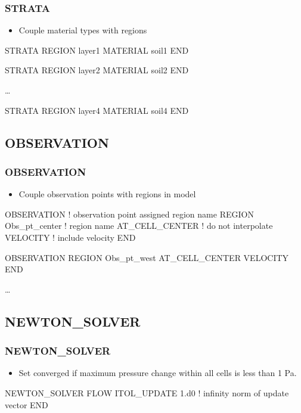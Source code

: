 \documentclass{beamer}
\newcommand\bluecomment[1]{{{\color{blue} #1}}}
\begin{document}
\begin{frame}[fragile]\frametitle{STRATA}

\begin{itemize}
\item Couple material types with regions
\end{itemize}

\begin{semiverbatim}
STRATA
  REGION layer1
  MATERIAL soil1
END

STRATA
  REGION layer2
  MATERIAL soil2
END

\ldots

STRATA
  REGION layer4
  MATERIAL soil4
END
\end{semiverbatim}

\end{frame}


\subsection{OBSERVATION}

\begin{frame}[fragile]\frametitle{OBSERVATION}

\begin{itemize}
\item Couple observation points with regions in model
\end{itemize}

\begin{semiverbatim}
OBSERVATION  \bluecomment{! observation point assigned region name}
  REGION Obs_pt_center  \bluecomment{! region name}
  AT_CELL_CENTER        \bluecomment{! do not interpolate}
  VELOCITY              \bluecomment{! include velocity}
END

OBSERVATION
  REGION Obs_pt_west
  AT_CELL_CENTER
  VELOCITY
END

\dots
\end{semiverbatim}

\end{frame}

\subsection{NEWTON\_SOLVER}

\begin{frame}[fragile]\frametitle{NEWTON\_SOLVER}

\begin{itemize}
  \item Set converged if maximum pressure change within all cells is less than 1 Pa.
\end{itemize}

\begin{semiverbatim}

NEWTON_SOLVER FLOW
  ITOL_UPDATE 1.d0   \bluecomment{! infinity norm of update vector}
END
\end{semiverbatim}

\end{frame}
\end{document}
